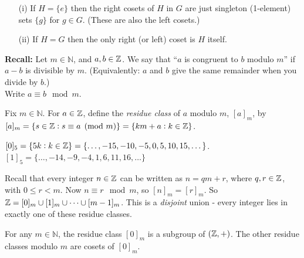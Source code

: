 \documentclass[twoside]{scrartcl}
\begin{document}
\begin{remarks}\begin{enumerate}
\item[(i)] If $H = \{e\}$ then the right cosets of $H$ in $G$ are just singleton (1-element)	 sets $\{g\}$ for $g \in G$. (These are also the left cosets.) 
\item[(ii)] If $H = G$ then the only right (or left) coset is $H$ itself.
\end{enumerate}
\end{remarks}\vspace*{10pt}




\textbf{Recall:}   
Let $m \in \mathbb{N}$, and $a,b \in \mathbb{Z}$. We say that ``$a$ is congruent to $b$ modulo $m$'' if $a-b$ is divisible by $m$. (Equivalently: $a$ and $b$ give the same remainder when you divide by $b$.)\\

Write $a \equiv b \mod m$.\\

\begin{definition} Fix $m \in \mathbb{N}$. For $a \in \mathbb{Z}$, define the \emph{residue class} of $a$ modulo $m$, $[a]_m$, by $[a]_m = \{s \in \mathbb{Z} : s \equiv a \pmod{m}\} = \{km + a : k \in \mathbb{Z}\}$.	
\end{definition}\vspace*{10pt}



\begin{examples} $[0]_5 = \{5k : k \in \mathbb{Z}\} = \{\dots, -15,-10,-5,0,5,10,15,\dots\}$.\\
$[1]_5 = \{\dots,-14,-9,-4,1,6,11,16,\dots\}$
\end{examples}

Recall that every integer $n \in \mathbb{Z}$ can be written as $n = qm + r$, where $q,r \in \mathbb{Z}$, with $0 \leq r < m$. Now $n \equiv r \mod m$, so $[n]_m = [r]_m$. So $\mathbb{Z} = [0]_m \cup [1]_m \cup \dots \cup [m-1]_m$. This is a \emph{disjoint} union - every integer lies in exactly one of these residue classes.\\

\begin{proposition} For any $m \in \mathbb{N}$, the residue class $[0]_m$ is a subgroup of $(\mathbb{Z},+)$. The other residue classes modulo $m$ are cosets of $[0]_m$. 	
\end{proposition}
\end{document}
